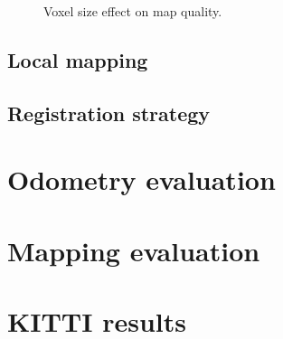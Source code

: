 \begin{figure}[h]
    \centering
    \hspace{1pt}
    \caption[Voxel size effect on map quality]{Voxel size effect on map quality.}
    \label{fig:gicp-corrections}
\end{figure}




\subsection{Local mapping}

\subsection{Registration strategy}


\section{Odometry evaluation}

\section{Mapping evaluation}

\section{KITTI results}

